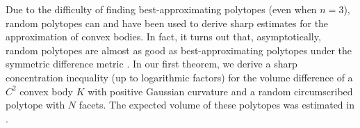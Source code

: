 Due to the difficulty of finding  best-approximating polytopes (even when $n = 3$), random polytopes can and have been used to derive sharp estimates for the approximation of convex bodies. In fact, it turns out that, asymptotically, random polytopes are almost as good as best-approximating polytopes under the symmetric difference metric \cite{boroczky2004approximation,GruberII,kur2017approximation,ludwig1999asymptotic,Lud06,muller1990approximation,schutt2003polytopes}. 
In our first theorem, we derive a sharp concentration inequality (up to logarithmic factors)  for the volume difference of a $ C^2 $ convex body $K$ with  positive Gaussian curvature and a random circumscribed polytope with $N$ facets. %
The expected volume of these polytopes was estimated in \cite{boroczky2004approximation}. 



